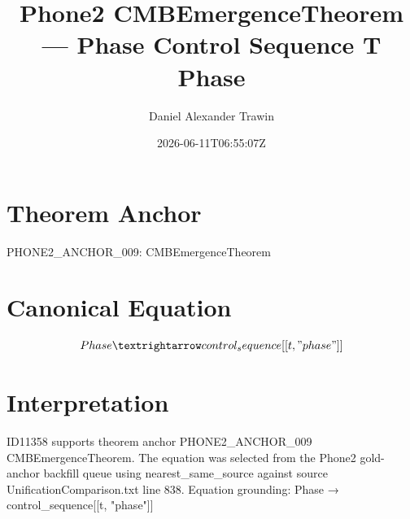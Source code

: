 \documentclass[11pt]{article}
\title{Phone2 CMBEmergenceTheorem — Phase Control Sequence T Phase}
\author{Daniel Alexander Trawin}
\date{2026-06-11T06:55:07Z}
\begin{document}
\maketitle
\section*{Theorem Anchor}
PHONE2_ANCHOR_009: CMBEmergenceTheorem
\section*{Canonical Equation}
\[
Phase → control_sequence[[t, "phase"]]
\]
\section*{Interpretation}
ID11358 supports theorem anchor PHONE2_ANCHOR_009 CMBEmergenceTheorem. The equation was selected from the Phone2 gold-anchor backfill queue using nearest_same_source against source UnificationComparison.txt line 838. Equation grounding: Phase → control_sequence[[t, "phase"]]
\end{document}
